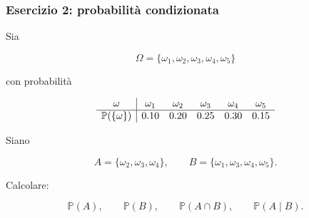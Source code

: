 \documentclass[handout]{beamer}%
\providecommand{\Prob}{\mathbb{P}}
\providecommand{\1}{\mathbf{1}}
\providecommand{\QTR}[2]{\csname #1\endcsname{#2}}
\begin{document}
\begin{frame}%
%

\frametitle{Esercizio 2: probabilit\`{a} condizionata}%


Sia%

\[
\Omega=\{\omega_{1},\omega_{2},\omega_{3},\omega_{4},\omega_{5}\}
\]


con probabilit\`{a}%

\[%
\begin{array}
[c]{c|ccccc}%
\omega & \omega_{1} & \omega_{2} & \omega_{3} & \omega_{4} & \omega
_{5}\\\hline
\Prob(\{\omega\}) & 0.10 & 0.20 & 0.25 & 0.30 & 0.15
\end{array}
\]


\medskip

Siano%

\[
A=\{\omega_{2},\omega_{3},\omega_{4}\}, \qquad B=\{\omega_{1},\omega
_{3},\omega_{4},\omega_{5}\}.
\]


\medskip

Calcolare:%

\[
\Prob(A),\qquad\Prob(B),\qquad\Prob(A\cap B),\qquad\Prob(A\mid B).
\]
%

\transboxout
\end{frame}%


%
\end{document}
